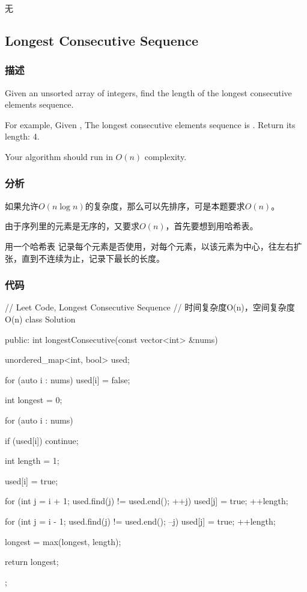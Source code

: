 \begindot
\item 无
\myenddot


\subsection{Longest Consecutive Sequence} %
\label{sec:longest-consecutive-sequence}


\subsubsection{描述}
Given an unsorted array of integers, find the length of the longest consecutive elements sequence.

For example,
Given \code{[100, 4, 200, 1, 3, 2]},
The longest consecutive elements sequence is \code{[1, 2, 3, 4]}. Return its length: 4.

Your algorithm should run in $O(n)$ complexity.


\subsubsection{分析}
如果允许$O(n \log n)$的复杂度，那么可以先排序，可是本题要求$O(n)$。

由于序列里的元素是无序的，又要求$O(n)$，首先要想到用哈希表。

用一个哈希表 记录每个元素是否使用，对每个元素，以该元素为中心，往左右扩张，直到不连续为止，记录下最长的长度。


\subsubsection{代码}
\begin{Code}
// Leet Code, Longest Consecutive Sequence
// 时间复杂度O(n)，空间复杂度O(n)
class Solution {
public:
    int longestConsecutive(const vector<int> &nums) {
        unordered_map<int, bool> used;

        for (auto i : nums) used[i] = false;

        int longest = 0;

        for (auto i : nums) {
            if (used[i]) continue;

            int length = 1;

            used[i] = true;

            for (int j = i + 1; used.find(j) != used.end(); ++j) {
                used[j] = true;
                ++length;
            }

            for (int j = i - 1; used.find(j) != used.end(); --j) {
                used[j] = true;
                ++length;
            }

            longest = max(longest, length);
        }

        return longest;
    }
};
\end{Code}

